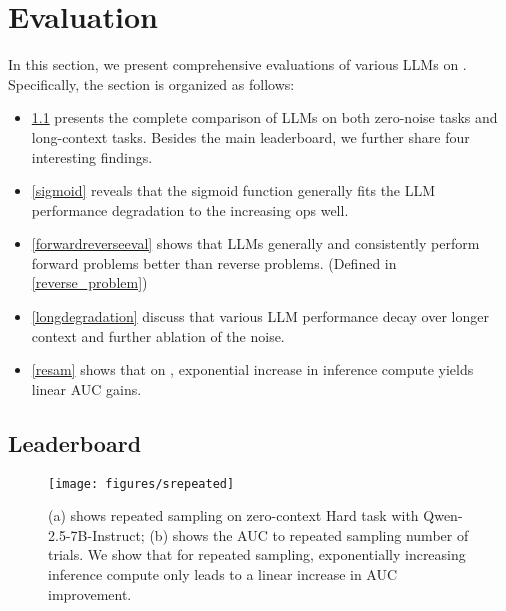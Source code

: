 \section{Evaluation} 

In this section, we present comprehensive evaluations of various LLMs on \sysb. Specifically, the section is organized as follows: 
\begin{itemize}[leftmargin=*, itemsep=0pt, parsep=0pt, topsep=0pt] 
    \item \cref{leaderboardtwo} presents the complete comparison of LLMs on both zero-noise tasks and long-context tasks. Besides the main leaderboard, we further share four interesting findings. 
    \item \cref{sigmoid} reveals that the sigmoid function generally fits the LLM performance degradation to the increasing ops well. 
    \item \cref{forwardreverseeval} shows that LLMs generally and consistently perform forward problems better than reverse problems. (Defined in \ref{reverse_problem}) 
    \item \cref{longdegradation} discuss that various LLM performance decay over longer context and further ablation of the noise. 
    \item \cref{resam} shows that on \sysb, exponential increase in inference compute yields linear AUC gains. 
\end{itemize} 

\subsection{Leaderboard} 
\label{leaderboardtwo} 

\begin{wrapfigure}{r}{0.6\textwidth} 
    \centering
    \texttt{[image: figures/srepeated]} 
    \caption{(a) shows repeated sampling on zero-context Hard task with Qwen-2.5-7B-Instruct; (b) shows the AUC to repeated sampling number of trials. We show that for repeated sampling, exponentially increasing inference compute only leads to a linear increase in AUC improvement.} 
    \vspace{-7mm} 
    \label{aucrepeated} 
\end{wrapfigure} 

